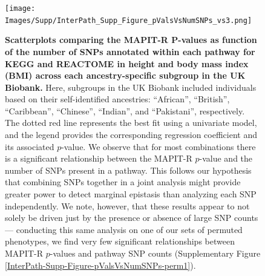 \documentclass[10pt]{article}
\begin{document}
\begin{landscape}
\begin{figure}[htbp]
\centering
\vspace*{-2.2cm}
\texttt{[image: Images/Supp/InterPath\_Supp\_Figure\_pValsVsNumSNPs\_vs3.png]}
\caption{\textbf{Scatterplots comparing the MAPIT-R $\bm{P}$-values as function of the number of SNPs annotated within each pathway for KEGG and REACTOME in height and body mass index (BMI) across each ancestry-specific subgroup in the UK Biobank.} Here, subgroups in the UK Biobank included individuals based on their self-identified ancestries: ``African'', ``British'', ``Caribbean'', ``Chinese'', ``Indian'', and ``Pakistani'', respectively. The dotted red line represents the best fit using a univariate model, and the legend provides the corresponding regression coefficient and its associated $p$-value. We observe that for most combinations there is a significant relationship between the MAPIT-R $p$-value and the number of SNPs present in a pathway. This follows our hypothesis that combining SNPs together in a joint analysis might provide greater power to detect marginal epistasis than analyzing each SNP independently. We note, however, that these results appear to not solely be driven just by the presence or absence of large SNP counts --- conducting this same analysis on one of our sets of permuted phenotypes, we find very few significant relationships between MAPIT-R $p$-values and pathway SNP counts (Supplementary Figure \ref{InterPath-Supp-Figure-pValsVsNumSNPs-perm1}).}
\label{InterPath-Supp-Figure-pValsVsNumSNPs}
\end{figure}
\clearpage
\end{landscape}
\end{document}
